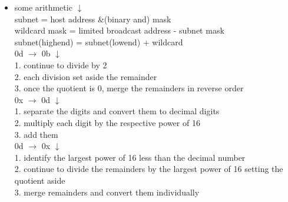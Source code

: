\documentclass{article}
\begin{document}
\begin{itemize}
  		
  	\item[] some arithmetic $\downarrow$\\
  		subnet = host address \&(binary and) mask\\ 
  		wildcard mask = limited broadcast address - subnet mask\\
  		subnet(highend) = subnet(lowend) + wildcard\\
  		0d $\rightarrow$ 0b $\downarrow$\\
  		1. continue to divide by 2\\
  		2. each division set aside the remainder\\
  		3. once the quotient is 0, merge the remainders in reverse order\\
  		0x $\rightarrow$ 0d $\downarrow$\\
  		1. separate the digits and convert them to decimal digits\\
  		2. multiply each digit by the respective power of 16\\
  		3. add them\\
  		0d $\rightarrow$ 0x $\downarrow$\\
  		1. identify the largest power of 16 less than the decimal number\\
  		2. continue to divide the remainders by the largest power of 16 setting the quotient aside\\
  		3. merge remainders and convert them individually
  		

\end{itemize}
\end{document}
